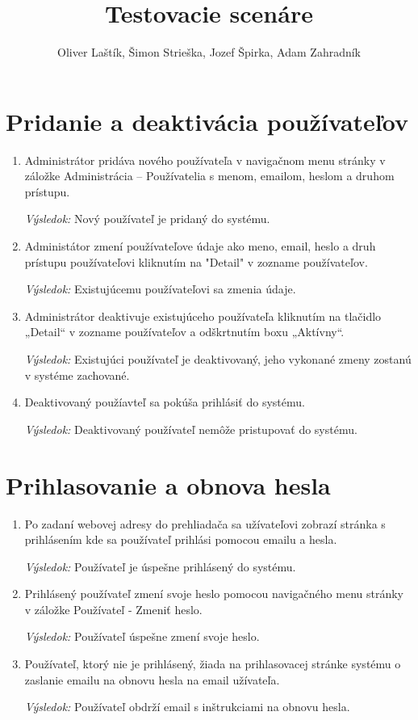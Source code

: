\documentclass{zah}
\title{Testovacie scenáre}
\author{Oliver Laštík, Šimon Strieška, Jozef Špirka, Adam Zahradník}
\begin{document}
\maketitle

\section{Pridanie a deaktivácia používateľov}

\begin{enumerate}
	\item Administrátor pridáva nového používateľa v navigačnom menu stránky v záložke 
	Administrácia -- Používatelia s menom, emailom, heslom a druhom prístupu.
	
	\textit{Výsledok:} Nový používateľ je pridaný do systému.
	
	\item Administátor zmení používateľove údaje ako meno, email, heslo a druh prístupu používateľovi
	kliknutím na "Detail" v zozname používateľov.

	\textit{Výsledok:} Existujúcemu používateľovi sa zmenia údaje.

	\item Administrátor deaktivuje existujúceho používateľa kliknutím na tlačidlo „Detail“ 
	v zozname používateľov a odškrtnutím boxu „Aktívny“.

	\textit{Výsledok:} Existujúci používateľ je deaktivovaný, jeho vykonané zmeny zostanú v systéme zachované.

	\item Deaktivovaný použíavteľ sa pokúša prihlásiť do systému.
	
	\textit{Výsledok:} Deaktivovaný používateľ nemôže pristupovať do systému.

\end{enumerate}


\section{Prihlasovanie a obnova hesla}

\begin{enumerate}
	\item Po zadaní webovej adresy do prehliadača sa užívateľovi zobrazí stránka s prihlásením kde sa používateľ prihlási pomocou emailu a hesla.

	\textit{Výsledok:} Používateľ je úspešne prihlásený do systému.
	
	\item Prihlásený používateľ zmení svoje heslo pomocou navigačného menu stránky v záložke Používateľ - Zmeniť heslo.
	
	\textit{Výsledok:} Používateľ úspešne zmení svoje heslo.

	\item Používateľ, ktorý nie je prihlásený, žiada na prihlasovacej stránke systému o zaslanie emailu na obnovu hesla na email užívateľa.
	
	\textit{Výsledok:} Používateľ obdrží email s inštrukciami na obnovu hesla.
\end{enumerate}
\end{document}
